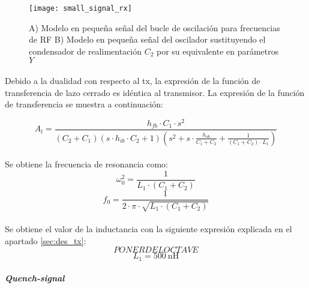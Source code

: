 \begin{figure}[h]
    \centering
    \texttt{[image: small\_signal\_rx]}
    \caption{A) Modelo en pequeña señal del bucle de oscilación para frecuencias de RF B) Modelo en pequeña señal del oscilador sustituyendo el condensador de realimentación $C_2$ por su equivalente en parámetros $Y$}
    \label{fig:ss_rx}
\end{figure}

\paragraph{}
Debido a la dualidad con respecto al tx, la expresión de la función de transferencia de lazo cerrado es idéntica al transmisor. La expresi\'on de la funci\'on de transferencia se muestra a continuaci\'on:

\begin{equation}
   \label{eq:Al_tx}
   A_l = \frac{h_{fb} \cdot C_1 \cdot s^2}{ \left( C_2+C_1 \right) \left( s \cdot h_{ib} \cdot C_2 + 1\right) \left( s^2 + s \cdot \frac{h_{ob}}{C_1 + C_2} + \frac{1}{(C_1 + C_2)\cdot L_1}\right) }
\end{equation}

\paragraph{}
Se obtiene la frecuencia de resonancia como: $$\omega_0^2 = \frac{1}{L_1 \cdot (C_1 + C_2)}$$
$$ f_0 = \frac{1}{2 \cdot \pi \cdot \sqrt{L_1 \cdot (C_1 + C_2)}} $$
\paragraph{}
Se obtiene el valor de la inductancia con la siguiente expresi\'on explicada en el apartado \ref{sec:des_tx}:
\begin{equation}
	\label{eq:inductance}
PONER DEL OCTAVE
\end{equation}
$$ L_1 = \SI{500}{\nano\henry} $$


\paragraph{\textit{Quench-signal}} %
